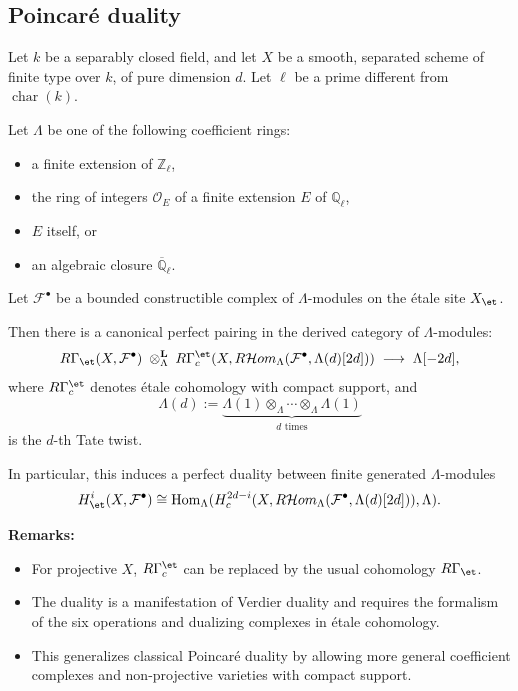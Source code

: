 \subsection{Poincar\'e duality}


\begin{theorem}
Let $k$ be a separably closed field, and let $X$ be a smooth, separated scheme of finite type over $k$, of pure dimension $d$. Let $\ell$ be a prime different from $\operatorname{char}(k)$. 

Let $\Lambda$ be one of the following coefficient rings: 
\begin{itemize}
  \item a finite extension of $\mathbb{Z}_\ell$, 
  \item the ring of integers $\mathcal{O}_E$ of a finite extension $E$ of $\mathbb{Q}_\ell$, 
  \item $E$ itself, or 
  \item an algebraic closure $\overline{\mathbb{Q}}_\ell$.
\end{itemize}

Let $\mathcal{F}^\bullet$ be a bounded constructible complex of $\Lambda$-modules on the étale site $X_{\et}$.

Then there is a canonical perfect pairing in the derived category of $\Lambda$-modules:
$$
R\Gamma_{\et}(X, \mathcal{F}^\bullet) \;\otimes_{\Lambda}^{\mathbf{L}}\; R\Gamma_c^{\et}(X, R\mathcal{H}om_{\Lambda}(\mathcal{F}^\bullet, \Lambda(d)[2d])) \;\longrightarrow\; \Lambda[-2d],
$$
where $R\Gamma_c^{\et}$ denotes étale cohomology with compact support, and 
$$
\Lambda(d) := \underbrace{\Lambda(1) \otimes_{\Lambda} \cdots \otimes_{\Lambda} \Lambda(1)}_{d \text{ times}}
$$
is the $d$-th Tate twist.

In particular, this induces a perfect duality between finite generated $\Lambda$-modules
$$
H^i_{\et}(X, \mathcal{F}^\bullet) \cong \operatorname{Hom}_{\Lambda}(H_c^{2d - i}(X, R\mathcal{H}om_{\Lambda}(\mathcal{F}^\bullet, \Lambda(d)[2d])), \Lambda).
$$

\textbf{Remarks:}
\begin{itemize}
    \item For projective $X$, $R\Gamma_c^{\et}$ can be replaced by the usual cohomology $R\Gamma_{\et}$.
    \item The duality is a manifestation of Verdier duality and requires the formalism of the six operations and dualizing complexes in étale cohomology.
    \item This generalizes classical Poincaré duality by allowing more general coefficient complexes and non-projective varieties with compact support.
\end{itemize}
\end{theorem}

